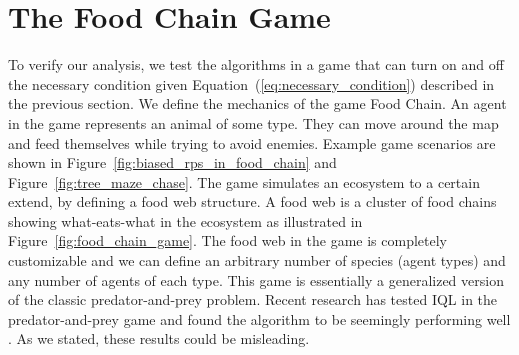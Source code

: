 \documentclass[]{interact}
\theoremstyle{plain}%
\theoremstyle{definition}
\theoremstyle{remark}
\begin{document}
\section{The Food Chain Game}
To verify our analysis, we test the algorithms in a game that can turn on and off the necessary condition given Equation~(\ref{eq:necessary_condition}) described in the previous section. We define the mechanics of the game Food Chain. An agent in the game represents an animal of some type. They can move around the map and feed themselves while trying to avoid enemies. Example game scenarios are shown in Figure~\ref{fig:biased_rps_in_food_chain} and Figure~\ref{fig:tree_maze_chase}. The game simulates an ecosystem to a certain extend, by defining a food web structure. A food web is a cluster of food chains showing what-eats-what in the ecosystem as illustrated in Figure~\ref{fig:food_chain_game}. The food web in the game is completely customizable and we can define an arbitrary number of species (agent types) and any number of agents of each type. This game is essentially a generalized version of the classic predator-and-prey problem. Recent research has tested IQL in the predator-and-prey game and found the algorithm to be seemingly performing well \cite{kopacz2023evaluating}. As we stated, these results could be misleading.
\end{document}
